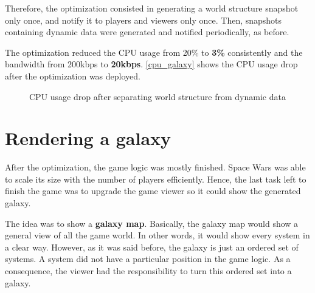 \documentclass[a4paper,11pt,titlepage,abstract,numbers=noenddot,automark,mnsy,intlimits,rgb,dvipsnames]{report}
\begin{document}
Therefore, the optimization consisted in generating a world structure snapshot only once, and notify it to players and
viewers only once. Then, snapshots containing dynamic data were generated and notified periodically, as before.

The optimization reduced the CPU usage from 20\% to \textbf{3\%} consistently and the bandwidth from 200kbps to \textbf{20kbps}.
\autoref{cpu_galaxy} shows the CPU usage drop after the optimization was deployed.
\begin{figure}[H]
\noindent{}
\caption{CPU usage drop after separating world structure from dynamic data}
\label{cpu_galaxy}
\end{figure}
\section{Rendering a galaxy}
After the optimization, the game logic was mostly finished. Space Wars was able to scale its size with the number of players
efficiently. Hence, the last task left to finish the game was to upgrade the game viewer so it could show the generated galaxy.

The idea was to show a \textbf{galaxy map}. Basically, the galaxy map would show a general view of all the game world. In other words,
it would show every system in a clear way. However, as it was said before, the galaxy is just an ordered set of systems.
A system did not have a particular position in the game logic. As a consequence, the viewer had the responsibility to turn this
ordered set into a galaxy.
\end{document}
